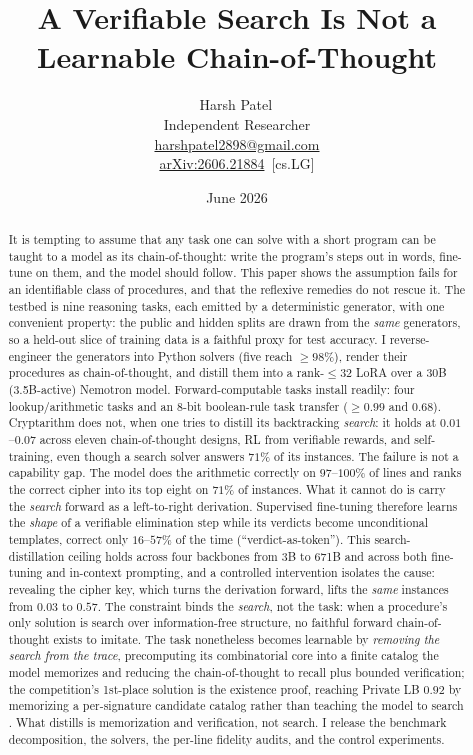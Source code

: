 \documentclass[11pt]{article}
\title{\textbf{A Verifiable Search Is Not a Learnable Chain-of-Thought}}
\author{%
  Harsh Patel\,\orcidlink{0009-0005-1704-811X}\\[2pt]
  \normalsize Independent Researcher\\[1pt]
  \normalsize \href{mailto:harshpatel2898@gmail.com}{harshpatel2898@gmail.com}\\[4pt]
  \normalsize \href{https://arxiv.org/abs/2606.21884}{arXiv:2606.21884}~[cs.LG]
}
\date{June 2026}
\begin{document}
\maketitle

\begin{abstract}
It is tempting to assume that any task one can solve with a short program can be taught to a
model as its chain-of-thought: write the program's steps out in words, fine-tune on them, and
the model should follow. This paper shows the assumption fails for an identifiable class of
procedures, and that the reflexive remedies do not rescue it. The testbed is nine reasoning
tasks, each emitted by a deterministic generator, with one convenient property: the public and
hidden splits are drawn from the \emph{same} generators, so a held-out slice of training data
is a faithful proxy for test accuracy. I reverse-engineer the generators into Python solvers
(five reach $\geq\!98\%$), render their procedures as chain-of-thought, and distill them into a
rank-$\leq\!32$ LoRA over a 30B (3.5B-active) Nemotron model. Forward-computable tasks install
readily: four lookup/arithmetic tasks and an 8-bit boolean-rule task transfer ($\geq\!0.99$ and
$0.68$). Cryptarithm does not, when one tries to distill its backtracking \emph{search}: it holds
at $0.01$--$0.07$ across eleven chain-of-thought designs, RL from verifiable rewards, and
self-training, even though a search solver answers $71\%$ of its instances. The failure is not a
capability gap. The model does the arithmetic correctly on $97$--$100\%$ of lines and ranks the
correct cipher into its top eight on $71\%$ of instances. What it cannot do is carry the
\emph{search} forward as a left-to-right derivation. Supervised fine-tuning therefore learns the
\emph{shape} of a verifiable elimination step while its verdicts become unconditional templates,
correct only $16$--$57\%$ of the time (``verdict-as-token''). This search-distillation ceiling
holds across four backbones from 3B to 671B and across both fine-tuning and in-context prompting,
and a controlled intervention isolates the cause: revealing the cipher key, which turns the
derivation forward, lifts the \emph{same} instances from $0.03$ to $0.57$. The constraint binds
the \emph{search}, not the task: when a procedure's only solution is search over information-free
structure, no faithful forward chain-of-thought exists to imitate. The task nonetheless becomes
learnable by \emph{removing the search from the trace}, precomputing its combinatorial core into a
finite catalog the model memorizes and reducing the chain-of-thought to recall plus bounded
verification; the competition's 1st-place solution is the existence proof, reaching Private LB
$0.92$ by memorizing a per-signature candidate catalog rather than teaching the model to search
\citep{goodmeatday2026first}. What distills is memorization and verification, not search. I
release the benchmark decomposition, the solvers, the per-line fidelity audits, and the control
experiments.
\end{abstract}
\end{document}
